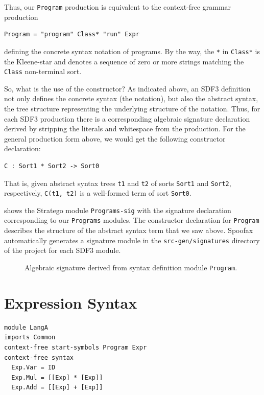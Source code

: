 Thus, our \texttt{Program} production is equivalent to the context-free grammar
production

\begin{lstlisting}[language=SDF]
  Program = "program" Class* "run" Expr
\end{lstlisting}

defining the concrete syntax notation of programs. By the way, the \texttt{*} in
\texttt{Class*} is the Kleene-star and denotes a sequence of zero or more
strings matching the \texttt{Class} non-terminal sort.

So, what is the use of the constructor? As indicated above, an SDF3 definition
not only defines the concrete syntax (the notation), but also the abstract
syntax, the tree structure representing the underlying structure of the
notation. Thus, for each SDF3 production there is a corresponding algebraic
signature declaration derived by stripping the literals and whitespace from the
production. For the general production form above, we would get the following
constructor declaration:

\begin{lstlisting}[language=Stratego]
  C : Sort1 * Sort2 -> Sort0
\end{lstlisting}

That is, given abstract syntax trees \texttt{t1} and \texttt{t2} of sorts
\texttt{Sort1} and \texttt{Sort2}, respectively, \texttt{C(t1, t2)} is a
well-formed term of sort \texttt{Sort0}.

 shows the Stratego module \texttt{Programs-sig}
with the signature declaration corresponding to our \texttt{Programs} modules.
The constructor declaration for \texttt{Program} describes the structure of the
abstract syntax term that we saw above. Spoofax automatically generates a
signature module in the \texttt{src-gen/signatures} directory of the project for
each SDF3 module.

\begin{figure}[t]

\caption{Algebraic signature derived from syntax definition module
\texttt{Program}.}
\end{figure}

\section{Expression Syntax}


\begin{lstlisting}[language=SDF]
module LangA
imports Common
context-free start-symbols Program Expr
context-free syntax
  Exp.Var = ID
  Exp.Mul = [[Exp] * [Exp]]
  Exp.Add = [[Exp] + [Exp]]
\end{lstlisting}

